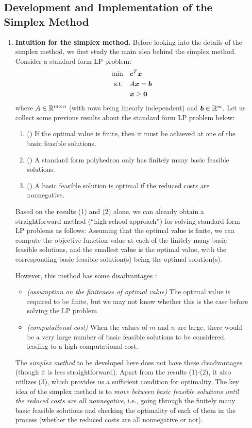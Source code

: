 \subsection{Development and Implementation of the Simplex Method}
\label{subsect:simplex-dev-implement}
\begin{enumerate}
\item \textbf{Intuition for the simplex method.}
Before looking into the details of the simplex method, we
first study the main idea behind the simplex method.  Consider
a standard form LP problem:
\begin{align*}
\text{min}\quad&\bm{c}^{T}\bm{x} \\
\text{s.t.}\quad&A\bm{x}=\bm{b} \\
&\bm{x}\ge \bm{0}
\end{align*}
where \(A\in\mathbb{R}^{m\times n}\) (with rows being linearly independent) and
\(\bm{b}\in\mathbb{R}^m\).
Let us collect some previous results about the standard form LP problem below:
\begin{enumerate}[label={(\arabic*)}]
\item () If the optimal value is finite, then it must be achieved at one of the
basic feasible solutions.
\item () A standard form polyhedron only has finitely many basic feasible solutions.
\item () A basic feasible solution is optimal if the
reduced costs are nonnegative.
\end{enumerate}
Based on the results (1) and (2) alone, we can already obtain a straightforward
method (``high school approach'') for solving standard form LP problems as
follows: Assuming that the optimal value is finite, we can compute the
objective function value at each of the finitely many basic feasible solutions,
and the smallest value is the optimal value, with the corresponding basic
feasible solution(s) being the optimal solution(s).

However, this method has some disadvantages :
\begin{itemize}
\item \emph{(assumption on the finiteness of optimal value)} The optimal value
is required to be finite, but we may not know whether this is the case before
solving the LP problem.
\item \emph{(computational cost)} When the values of \(m\) and \(n\) are large,
there would be a very large number of basic feasible solutions to be
considered, leading to a high computational cost.
\end{itemize}
The \emph{simplex method} to be developed here does not have these
disadvantages (though it is less straightforward). Apart from the results
(1)-(2), it also utilizes (3), which provides us a sufficient condition for
optimality. The key  idea of the simplex method is to \emph{move
between basic feasible solutions until the reduced costs are all nonnegative},
i.e., going through the finitely many basic feasible solutions and checking the
optimality of each of them in the process (whether the reduced costs are all
nonnegative or not).


\end{enumerate}
